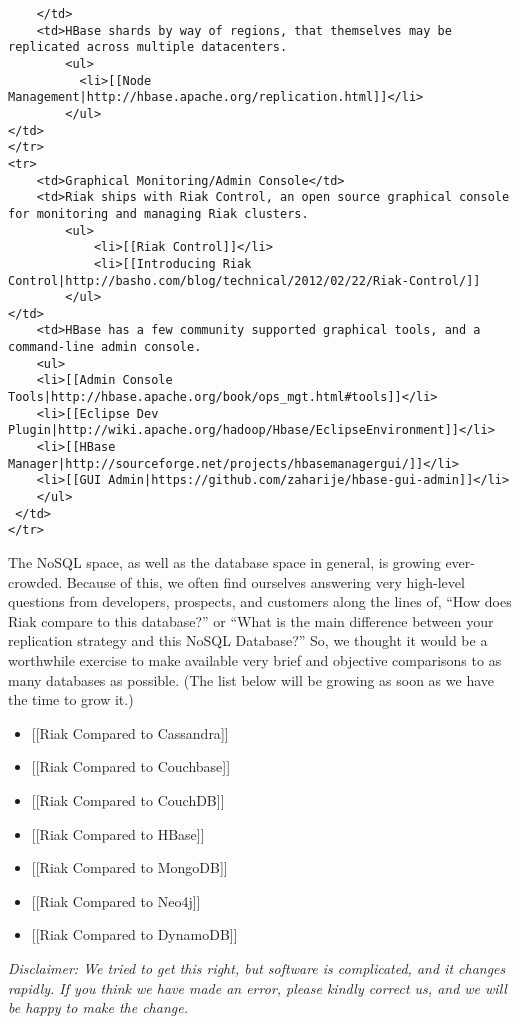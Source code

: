 \documentclass[letter]{book}
\newcounter{tab}[chapter]
\begin{document}
\begin{shaded}
\begin{verbatim}
    </td>
    <td>HBase shards by way of regions, that themselves may be replicated across multiple datacenters.
        <ul>
          <li>[[Node Management|http://hbase.apache.org/replication.html]]</li>
        </ul>
</td>
</tr>
<tr>
    <td>Graphical Monitoring/Admin Console</td>
    <td>Riak ships with Riak Control, an open source graphical console for monitoring and managing Riak clusters.
        <ul>
            <li>[[Riak Control]]</li>
            <li>[[Introducing Riak Control|http://basho.com/blog/technical/2012/02/22/Riak-Control/]]
        </ul>
</td>
    <td>HBase has a few community supported graphical tools, and a command-line admin console.
    <ul>
    <li>[[Admin Console Tools|http://hbase.apache.org/book/ops_mgt.html#tools]]</li>
    <li>[[Eclipse Dev Plugin|http://wiki.apache.org/hadoop/Hbase/EclipseEnvironment]]</li>
    <li>[[HBase Manager|http://sourceforge.net/projects/hbasemanagergui/]]</li>
    <li>[[GUI Admin|https://github.com/zaharije/hbase-gui-admin]]</li>
    </ul>
 </td>
</tr>
\end{verbatim}\end{shaded}

The NoSQL space, as well as the database space in general, is growing ever-crowded. Because of this, we often find ourselves answering very high-level questions from developers, prospects, and customers along the lines of, “How does Riak compare to this database?” or “What is the main difference between your replication strategy and this NoSQL Database?” So, we thought it would be a worthwhile exercise to make available very brief and objective comparisons to as many databases as possible. (The list below will be growing as soon as we have the time to grow it.)

\begin{itemize}
\itemsep1pt\parskip0pt
\item
  {[}{[}Riak Compared to Cassandra{]}{]}
\item
  {[}{[}Riak Compared to Couchbase{]}{]}
\item
  {[}{[}Riak Compared to CouchDB{]}{]}
\item
  {[}{[}Riak Compared to HBase{]}{]}
\item
  {[}{[}Riak Compared to MongoDB{]}{]}
\item
  {[}{[}Riak Compared to Neo4j{]}{]}
\item
  {[}{[}Riak Compared to DynamoDB{]}{]}
\end{itemize}

\emph{Disclaimer: We tried to get this right, but software is complicated, and it changes rapidly. If you think we have made an error, please kindly correct us, and we will be happy to make the change.}
\end{document}
